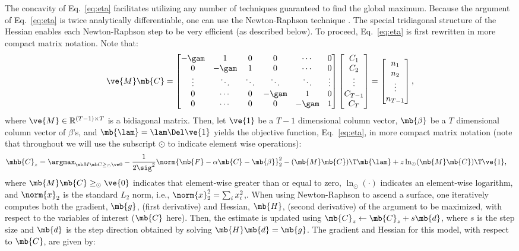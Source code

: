 The concavity of Eq.~\eqref{eq:eta} facilitates utilizing any number of techniques guaranteed to find the global maximum.  Because the argument of Eq.~\eqref{eq:eta} is twice analytically differentiable, one can use the Newton-Raphson technique \cite{Press92}. The special tridiagonal structure of the Hessian enables each Newton-Raphson step to be very efficient (as described below).  To proceed, Eq.~\eqref{eq:eta} is first rewritten in more compact matrix notation.  Note that:
\begin{align} \label{eq:M}
\ve{M} \mb{C} = %
\begin{bmatrix}
-\gam & 1 & 0 & 0 & \cdots & 0 \\
0 & -\gam & 1 & 0 & \cdots  & 0 \\
\vdots & \ddots & \ddots & \ddots & \ddots & \vdots  \\
0 & \cdots & 0  & -\gam & 1 & 0 \\
0 & \cdots & 0 & 0 & -\gam & 1
\end{bmatrix}
\begin{bmatrix}
C_1 \\ C_2 \\  \vdots \\ C_{T-1} \\ C_T
\end{bmatrix}
= 
\begin{bmatrix}
n_1 \\ n_2 \\ \vdots  \\ n_{T-1}
\end{bmatrix}
, %
\end{align}
\noindent where $\ve{M} \in \mathbb{R}^{(T-1) \times T}$ is a bidiagonal matrix.  Then, let $\ve{1}$ be a $T-1$ dimensional column vector, $\mb{\beta}$ be a $T$ dimensional column vector of $\beta$'s, and $\mb{\lam}=\lam \Del \ve{1}$ yields the objective function, Eq.~\eqref{eq:eta}, in more compact matrix notation (note that throughout we will use the subscript $\odot$ to indicate element wise operations):
\begin{align} 
\mhb{C}_{\zzz} 
&= \az  -\frac{1}{2 \sig^2} \norm{\mb{F} - \alpha \mb{C} -\mb{\beta}}_2^2 - (\mb{M} \mb{C} )\T \mb{\lam}  + \zzz \ln_\odot(\mb{M} \mb{C})\T\ve{1},  \label{eq:eta3}
\end{align}
\noindent where  $\mb{M} \mb{C} \geq_\odot \ve{0}$ indicates that element-wise greater than or equal to zero, $\ln_\odot(\cdot)$ indicates an element-wise logarithm, and $\norm{x}_2$ is the standard $L_2$ norm, i.e., $\norm{x}_2^2=\sum_i x_i^2$,. When using Newton-Raphson to ascend a surface, one iteratively computes both the gradient, $\mb{g}$, (first derivative) and Hessian, $\mb{H}$, (second derivative) of the argument to be maximized, with respect to the variables of interest ($\mb{C}$ here).  Then, the estimate is updated using $\mb{C}_z \leftarrow \mb{C}_z + s \mb{d}$, where $s$ is the step size and $\mb{d}$ is the step direction obtained by solving $\mb{H} \mb{d} = \mb{g}$.  The gradient and Hessian for this model, with respect to $\mb{C}$, are given by:

